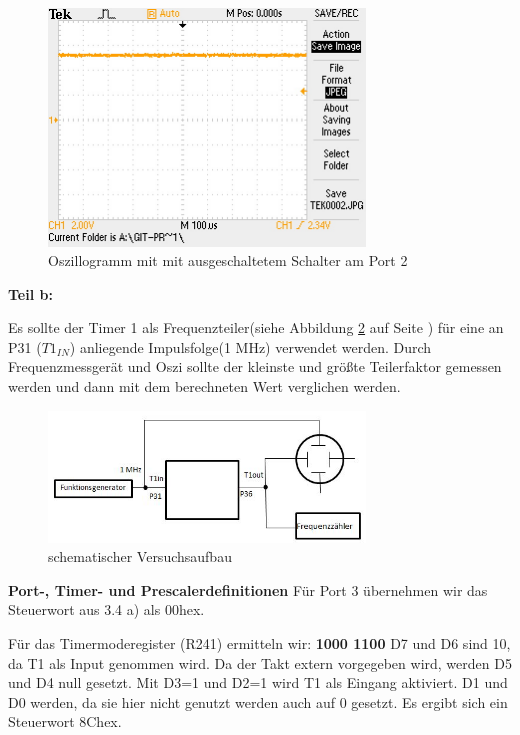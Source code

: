 \begin{figure}[!ht]
\begin{center}
\includegraphics[width=0.75\textwidth]{os2} 
\caption{Oszillogramm mit mit ausgeschaltetem Schalter am Port 2}
\label{os34a2}
\end{center}
\end{figure}


\newpage

\textbf{Teil b:}

Es sollte der Timer 1 als Frequenzteiler(siehe Abbildung \ref{34bv} auf Seite \pageref{34bv}) für eine an P31 ($T1_{IN}$) anliegende Impulsfolge(1 MHz) verwendet werden. Durch Frequenzmessgerät und Oszi sollte der kleinste und größte Teilerfaktor gemessen werden und dann mit dem berechneten Wert verglichen werden.

\begin{figure}[!ht]
\begin{center}
\includegraphics[width=0.75\textwidth]{34bv} 
\caption{schematischer Versuchsaufbau}
\label{34bv}
\end{center}
\end{figure}


\textbf{Port-, Timer- und Prescalerdefinitionen}
Für Port 3 übernehmen wir das Steuerwort aus 3.4 a) als 00hex.

Für das Timermoderegister (R241) ermitteln wir: \textbf{1000 1100}
D7 und D6 sind 10, da T1 als Input genommen wird.
Da der Takt extern vorgegeben wird, werden D5 und D4 null gesetzt.
Mit D3=1 und D2=1 wird T1 als Eingang aktiviert.
D1 und D0 werden, da sie hier nicht genutzt werden auch auf 0 gesetzt.
Es ergibt sich ein Steuerwort 8Chex.

